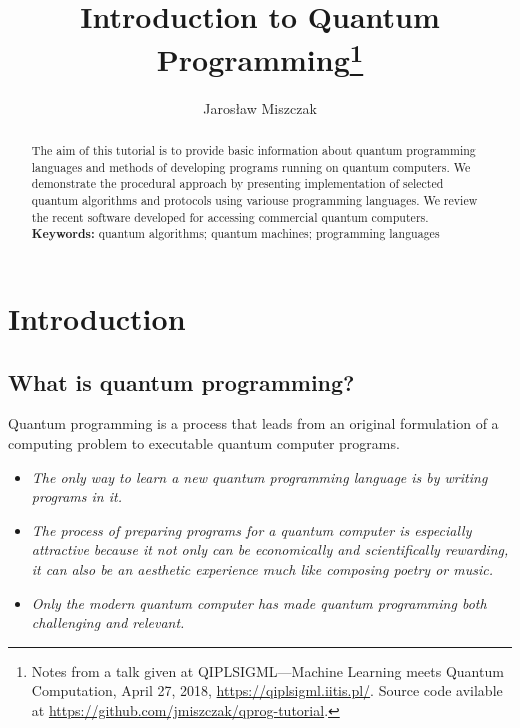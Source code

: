 \documentclass[a4paper,11pt]{article}
\begin{document}
\title{Introduction to Quantum Programming\footnote{Notes from a talk given at
QIPLSIGML---Machine Learning meets Quantum Computation, April 27, 2018,
\url{https://qiplsigml.iitis.pl/}. Source code avilable at
\url{https://github.com/jmiszczak/qprog-tutorial}.}}
\author{Jaros\l aw Miszczak}
\date{}

\maketitle

\begin{abstract}
The aim of this tutorial is to provide basic information about quantum
programming languages and methods of developing programs running on quantum
computers. We demonstrate the procedural approach by presenting implementation
of selected quantum algorithms and protocols using variouse programming
languages. We review the recent software developed for accessing commercial
quantum computers.\\[6pt]
\textbf{Keywords:} quantum algorithms; quantum machines; programming languages
\end{abstract}

\section{Introduction}

\subsection{What is quantum programming?}
Quantum programming is a process that leads from an original formulation of a 
computing problem to executable quantum computer programs.

\begin{itemize}

\item \emph{The only way to learn a new quantum programming language is 
    by writing programs in it.}

\item \emph{The process of preparing programs for a quantum computer is 
    especially attractive because it not only can be economically and 
    scientifically rewarding, it can also be an aesthetic experience much like 
    composing poetry or music.}

\item \emph{Only the modern quantum computer has made quantum 
    programming both challenging and relevant.}

\end{itemize}
\end{document}
